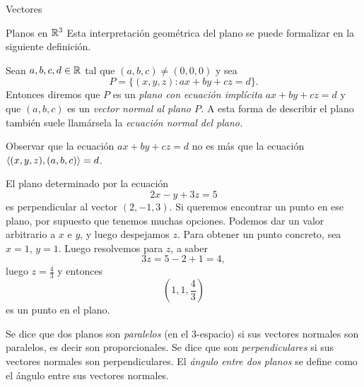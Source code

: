 \begin{chapter}{Vectores}
\begin{section}{Planos en $\mathbb R^3$}
        Esta interpretación geométrica del plano se puede formalizar en la siguiente definición.
        
        
        \begin{definicion}\label{def-eq-implicita-plano} Sean $a,b, c,d \in \mathbb R$ tal que $(a,b,c) \ne (0,0,0)$ y sea 
        \begin{equation*}
            P = \{(x,y,z): ax +by +cz =d\}.
        \end{equation*}
        Entonces diremos que $P$  es  un \textit{plano con ecuación implícita}  $ax +by +cz =d$ y  que $(a,b,c)$ es un \textit{vector normal al plano $P$.} A esta forma de describir el plano también suele llamársela la \textit{ecuación normal del plano.}
        \end{definicion} 
        
        Observar que la ecuación $ ax +by +cz =d$ no es más que la ecuación $\langle(x,y,z),(a,b,c) \rangle=d$. 	
        
        \begin{ejemplo*}
            El plano determinado por la ecuación
            \begin{equation*}
                2x - y 	+ 3z = 	5
            \end{equation*}
            es perpendicular al vector $(2, - 1, 3)$. Si queremos encontrar un punto en ese plano, por supuesto que tenemos muchas opciones. Podemos dar un valor arbitrario a $x$ e $y$, y luego despejamos $z$. Para obtener un punto concreto, sea $x = 1$, $y = 1$. Luego resolvemos para $z$, a saber
            \begin{equation*}
                3z 	= 5 - 2 + 1 = 4,
            \end{equation*}
            luego $z = \displaystyle\frac43$ y entonces
            \begin{equation*}
                (1,1,\frac43)
            \end{equation*}
            es un punto en el plano.
        \end{ejemplo*}
        
        Se dice que dos planos son \textit{paralelos} (en el 3-espacio) si sus vectores normales son paralelos,  es decir son proporcionales. Se dice que son \textit{perpendiculares} si sus vectores normales son perpendiculares. El \textit{ángulo entre dos planos} se define como el ángulo entre sus vectores normales.
        
        
        

\end{section}
\end{chapter}
